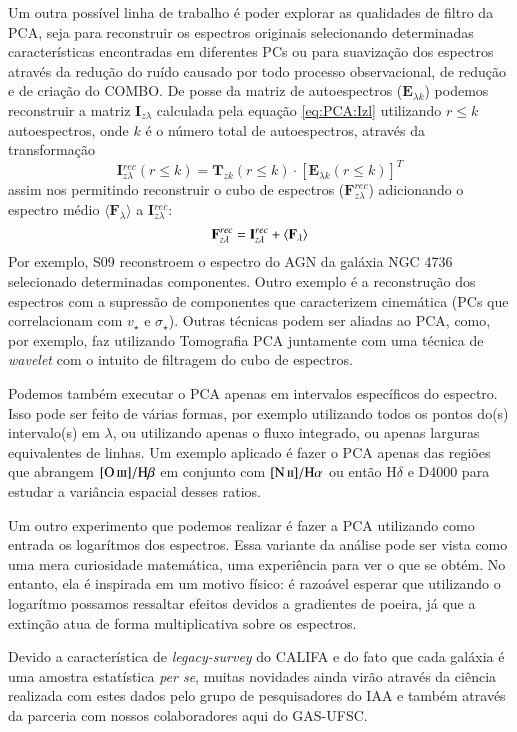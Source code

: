 Um outra possível linha de trabalho é poder explorar as qualidades de filtro da PCA, seja para reconstruir os espectros
originais selecionando determinadas características encontradas em diferentes PCs ou para suavização dos espectros
através da redução do ruído causado por todo processo observacional, de redução e de criação do COMBO. De posse da
matriz de autoespectros ($\mathbf{E}_{\lambda k}$) podemos reconstruir a matriz $\mathbf{I}_{z \lambda}$  calculada pela
equação \ref{eq:PCA:Izl} utilizando $r \leq k$ autoespectros, onde $k$ é o número total de autoespectros, através da
transformação
\begin{equation}
	\mathbf{I}{}_{z \lambda}^{rec}(r \leq k) = \mathbf{T}{}_{z k}(r \leq k) \cdot [\mathbf{E}{}_{\lambda k}(r \leq k)]^T
\end{equation}
\noindent assim nos permitindo reconstruir o cubo de espectros ($\mathbf{F}_{z \lambda}^{rec}$) adicionando o
espectro médio $\langle \mathbf{F}{}_\lambda \rangle$ a $\mathbf{I}{}_{z \lambda}^{rec}$:
\begin{equation}
	\mathbf{F}{}_{z \lambda}^{rec} = \mathbf{I}{}_{z \lambda}^{rec} + \mean{\mathbf{F}_\lambda}
\end{equation}
 \noindent Por exemplo, S09 reconstroem o espectro do AGN da galáxia NGC 4736 selecionado determinadas componentes.
 Outro exemplo é a reconstrução dos espectros com a supressão de componentes que caracterizem cinemática (PCs que
 correlacionam com $v_\star$ e $\sigma_\star$). Outras técnicas podem ser aliadas ao PCA, como, por exemplo, faz
 \citet{Riffel2011} utilizando Tomografia PCA juntamente com uma técnica de {\em wavelet} com o intuito de filtragem do
 cubo de espectros.

Podemos também executar o PCA apenas em intervalos específicos do espectro. Isso pode ser feito de várias formas, por
exemplo utilizando todos os pontos do(s) intervalo(s) em $\lambda$, ou utilizando apenas o fluxo integrado, ou apenas
larguras equivalentes de linhas. Um exemplo aplicado é fazer o PCA apenas das regiões que abrangem $\oIII/\Hbeta$ em
conjunto com $\nII/\Halpha$ ou então $\mathrm{H}\delta$ e D4000 para estudar a variância espacial desses ratios.

Um outro experimento que podemos realizar é fazer a PCA utilizando como entrada os logarítmos dos espectros. Essa
variante da análise pode ser vista como uma mera curiosidade matemática, uma experiência para ver o que se obtém. No
entanto, ela é inspirada em um motivo físico: é razoável esperar que utilizando o logarítmo possamos ressaltar efeitos
devidos a gradientes de poeira, já que a extinção atua de forma multiplicativa sobre os espectros.

Devido a característica de {\em legacy-survey} do CALIFA e do fato que cada galáxia é uma amostra estatística
{\em per se}, muitas novidades ainda virão através da ciência realizada com estes dados pelo grupo de pesquisadores do
IAA e também através da parceria com nossos colaboradores aqui do GAS-UFSC.

